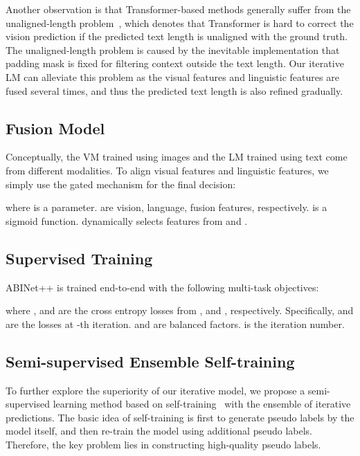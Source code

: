 \documentclass[10pt,journal,compsoc]{IEEEtran}
\begin{document}
Another observation is that Transformer-based methods generally suffer from the unaligned-length problem~\cite{yu2020towards}, which denotes that Transformer is hard to correct the vision prediction if the predicted text length is unaligned with the ground truth. The unaligned-length problem is caused by the inevitable implementation that padding mask is fixed for filtering context outside the text length. Our iterative LM can alleviate this problem as the visual features and linguistic features are fused several times, and thus the predicted text length is also refined gradually.


\subsection{Fusion Model}
\label{sec:fusion}

Conceptually, the VM trained using images and the LM trained using text come from different modalities. To align visual features and linguistic features, we simply use the gated mechanism \cite{yu2020towards, yue2020robustscanner} for the final decision:

where  is a parameter.  are vision, language, fusion features, respectively.  is a sigmoid function.   dynamically selects features from  and .


\subsection{Supervised Training}

ABINet++ is trained end-to-end with the following multi-task objectives:

where ,  and  are the cross entropy losses from ,  and , respectively. Specifically,  and  are the losses at -th iteration.  and  are balanced factors.  is the iteration number.



\subsection{Semi-supervised Ensemble Self-training}
\label{sec:semi-supervised}

To further explore the superiority of our iterative model, we propose a semi-supervised learning method based on self-training~\cite{xie2020self} with the ensemble of iterative predictions. The basic idea of self-training is first to generate pseudo labels by the model itself, and then re-train the model using additional pseudo labels. Therefore, the key problem lies in constructing high-quality pseudo labels.
\end{document}
